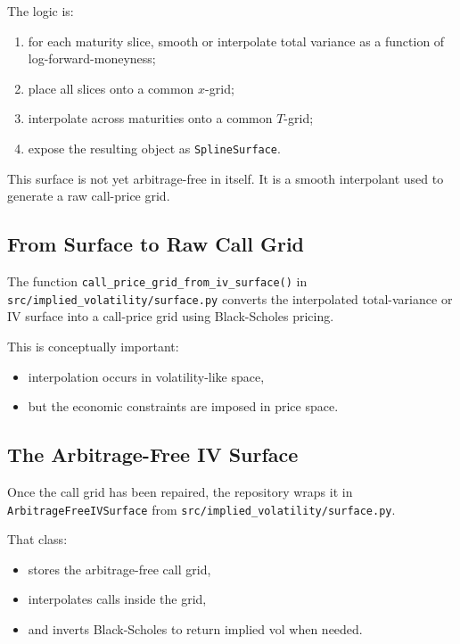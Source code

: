 \documentclass[11pt]{article}
\begin{document}
The logic is:

\begin{enumerate}
  \item for each maturity slice, smooth or interpolate total variance as a function of log-forward-moneyness;
  \item place all slices onto a common $x$-grid;
  \item interpolate across maturities onto a common $T$-grid;
  \item expose the resulting object as \texttt{SplineSurface}.
\end{enumerate}

This surface is not yet arbitrage-free in itself. It is a smooth interpolant used to generate a raw call-price grid.

\subsection{From Surface to Raw Call Grid}

The function
\texttt{call\_price\_grid\_from\_iv\_surface()} in
\texttt{src/implied\_volatility/surface.py}
converts the interpolated total-variance or IV surface into a call-price grid using Black-Scholes pricing.

This is conceptually important:

\begin{itemize}
  \item interpolation occurs in volatility-like space,
  \item but the economic constraints are imposed in price space.
\end{itemize}

\subsection{The Arbitrage-Free IV Surface}

Once the call grid has been repaired, the repository wraps it in
\texttt{ArbitrageFreeIVSurface} from
\texttt{src/implied\_volatility/surface.py}.

That class:

\begin{itemize}
  \item stores the arbitrage-free call grid,
  \item interpolates calls inside the grid,
  \item and inverts Black-Scholes to return implied vol when needed.
\end{itemize}
\end{document}
